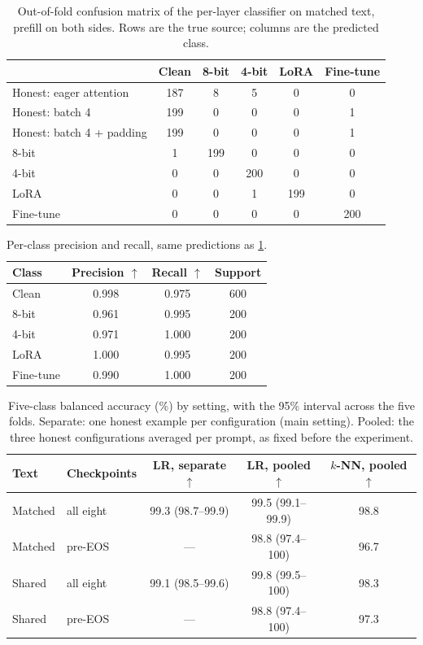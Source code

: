 \documentclass[11pt]{article}
\newcommand{\best}[1]{\cellcolor{blue!8}#1}
\newcommand{\up}{$\uparrow$}
\begin{document}
\begin{table}[!htb]
\centering
\small
\caption{Out-of-fold confusion matrix of the per-layer classifier on matched text, prefill on both sides. Rows are the true source; columns are the predicted class.}
\label{tab:confusion}
\begin{tabular}{@{}lccccc@{}}
\toprule
 & Clean & 8-bit & 4-bit & LoRA & Fine-tune \\
\midrule
Honest: eager attention   & \best{187} & 8 & 5 & 0 & 0 \\
Honest: batch 4           & \best{199} & 0 & 0 & 0 & 1 \\
Honest: batch 4 + padding & \best{199} & 0 & 0 & 0 & 1 \\
8-bit                     & 1 & \best{199} & 0 & 0 & 0 \\
4-bit                     & 0 & 0 & \best{200} & 0 & 0 \\
LoRA                      & 0 & 0 & 1 & \best{199} & 0 \\
Fine-tune                 & 0 & 0 & 0 & 0 & \best{200} \\
\bottomrule
\end{tabular}
\end{table}

\begin{table}[!htb]
\centering
\small
\caption{Per-class precision and recall, same predictions as \cref{tab:confusion}.}
\label{tab:perclass}
\begin{tabular}{@{}lccc@{}}
\toprule
Class & Precision \up & Recall \up & Support \\
\midrule
Clean     & 0.998 & 0.975 & 600 \\
8-bit     & 0.961 & 0.995 & 200 \\
4-bit     & 0.971 & 1.000 & 200 \\
LoRA      & 1.000 & 0.995 & 200 \\
Fine-tune & 0.990 & 1.000 & 200 \\
\bottomrule
\end{tabular}
\end{table}

\begin{table}[!htb]
\centering
\small
\caption{Five-class balanced accuracy (\%) by setting, with the 95\% interval across the five folds. Separate: one honest example per configuration (main setting). Pooled: the three honest configurations averaged per prompt, as fixed before the experiment.}
\label{tab:configs}
\begin{tabular}{@{}llccc@{}}
\toprule
Text & Checkpoints & LR, separate \up & LR, pooled \up & $k$-NN, pooled \up \\
\midrule
Matched & all eight & \best{99.3} {\scriptsize(98.7--99.9)} & 99.5 {\scriptsize(99.1--99.9)} & 98.8 \\
Matched & pre-EOS   & ---  & 98.8 {\scriptsize(97.4--100)} & 96.7 \\
Shared  & all eight & 99.1 {\scriptsize(98.5--99.6)} & 99.8 {\scriptsize(99.5--100)} & 98.3 \\
Shared  & pre-EOS   & ---  & 98.8 {\scriptsize(97.4--100)} & 97.3 \\
\bottomrule
\end{tabular}
\end{table}
\end{document}
